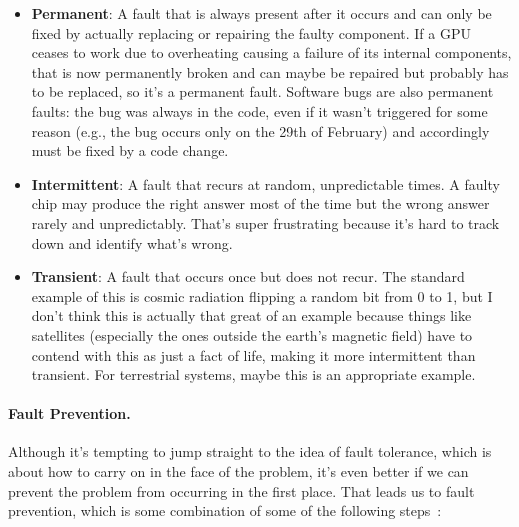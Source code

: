 \begin{itemize}
	\item \textbf{Permanent}: A fault that is always present after it occurs and can only be fixed by actually replacing or repairing the faulty component. If a GPU ceases to work due to overheating causing a failure of its internal components, that is now permanently broken and can maybe be repaired but probably has to be replaced, so it's a permanent fault. Software bugs are also permanent faults: the bug was always in the code, even if it wasn't triggered for some reason (e.g., the bug occurs only on the 29th of February) and accordingly must be fixed by a code change.
	
	\item \textbf{Intermittent}: A fault that recurs at random, unpredictable times. A faulty chip may produce the right answer most of the time but the wrong answer rarely and unpredictably. That's super frustrating because it's hard to track down and identify what's wrong.

	\item \textbf{Transient}: A fault that occurs once but does not recur. The standard example of this is cosmic radiation flipping a random bit from 0 to 1, but I don't think this is actually that great of an example because things like satellites (especially the ones outside the earth's magnetic field) have to contend with this as just a fact of life, making it more intermittent than transient. For terrestrial systems, maybe this is an appropriate example.

\end{itemize}

\paragraph{Fault Prevention.} 
Although it's tempting to jump straight to the idea of fault tolerance, which is about how to carry on in the face of the problem, it's even better if we can prevent the problem from occurring in the first place. That leads us to fault prevention, which is some combination of some of the following steps~\cite{mte241}:

